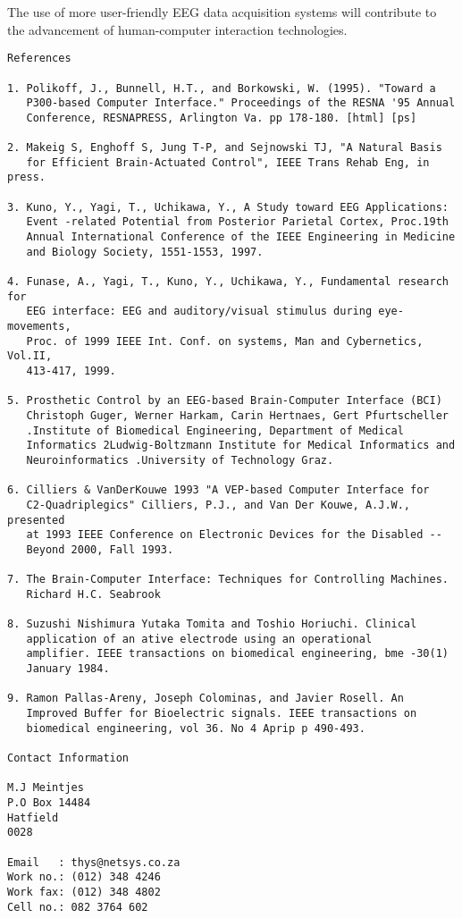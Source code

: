 \documentclass{article}
\begin{document}
The use of more user-friendly EEG data acquisition systems will
contribute to the advancement of human-computer interaction
technologies.

\begin{verbatim}
References 

1. Polikoff, J., Bunnell, H.T., and Borkowski, W. (1995). "Toward a
   P300-based Computer Interface." Proceedings of the RESNA '95 Annual
   Conference, RESNAPRESS, Arlington Va. pp 178-180. [html] [ps]

2. Makeig S, Enghoff S, Jung T-P, and Sejnowski TJ, "A Natural Basis
   for Efficient Brain-Actuated Control", IEEE Trans Rehab Eng, in press.

3. Kuno, Y., Yagi, T., Uchikawa, Y., A Study toward EEG Applications:
   Event -related Potential from Posterior Parietal Cortex, Proc.19th
   Annual International Conference of the IEEE Engineering in Medicine
   and Biology Society, 1551-1553, 1997.

4. Funase, A., Yagi, T., Kuno, Y., Uchikawa, Y., Fundamental research for
   EEG interface: EEG and auditory/visual stimulus during eye-movements,
   Proc. of 1999 IEEE Int. Conf. on systems, Man and Cybernetics, Vol.II,
   413-417, 1999.

5. Prosthetic Control by an EEG-based Brain-Computer Interface (BCI)
   Christoph Guger, Werner Harkam, Carin Hertnaes, Gert Pfurtscheller
   .Institute of Biomedical Engineering, Department of Medical
   Informatics 2Ludwig-Boltzmann Institute for Medical Informatics and
   Neuroinformatics .University of Technology Graz.

6. Cilliers & VanDerKouwe 1993 "A VEP-based Computer Interface for
   C2-Quadriplegics" Cilliers, P.J., and Van Der Kouwe, A.J.W., presented
   at 1993 IEEE Conference on Electronic Devices for the Disabled --
   Beyond 2000, Fall 1993.
				   
7. The Brain-Computer Interface: Techniques for Controlling Machines.
   Richard H.C. Seabrook

8. Suzushi Nishimura Yutaka Tomita and Toshio Horiuchi. Clinical
   application of an ative electrode using an operational
   amplifier. IEEE transactions on biomedical engineering, bme -30(1)
   January 1984.

9. Ramon Pallas-Areny, Joseph Colominas, and Javier Rosell. An
   Improved Buffer for Bioelectric signals. IEEE transactions on
   biomedical engineering, vol 36. No 4 Aprip p 490-493.

Contact Information 

M.J Meintjes
P.O Box 14484
Hatfield 
0028

Email   : thys@netsys.co.za
Work no.: (012) 348 4246
Work fax: (012) 348 4802
Cell no.: 082 3764 602

\end{verbatim}
\end{document}
